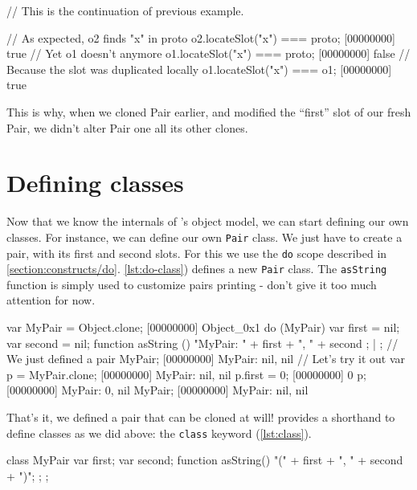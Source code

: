\documentclass[openright,twoside,12pt]{report}
\begin{document}
\begin{urbiscript}[caption=Inspecting copy on write,
  label=lst:check-copy-on-write, name=cow]
// This is the continuation of previous example.

// As expected, o2 finds "x" in proto
o2.locateSlot("x") === proto;
[00000000] true
// Yet o1 doesn't anymore
o1.locateSlot("x") === proto;
[00000000] false
// Because the slot was duplicated locally
o1.locateSlot("x") === o1;
[00000000] true
\end{urbiscript}

This is why, when we cloned Pair earlier, and modified the ``first''
slot of our fresh Pair, we didn't alter Pair one all its other clones.

\section{Defining classes}

Now that we know the internals of \urbi's object model, we can start
defining our own classes. For instance, we can define our own
\texttt{Pair} class. We just have to create a pair, with its first and
second slots. For this we use the \texttt{do} scope described in
\autoref{section:constructs/do}. \autoref{lst:do-class}) defines a new
\texttt{Pair} class. The \texttt{asString} function is simply used to
customize pairs printing - don't give it too much attention for now.

\begin{urbiscript}[caption=Defining our own \texttt{MyPair} class,
  label=lst:do-class]
var MyPair = Object.clone;
[00000000] Object_0x1
do (MyPair)
{
  var first = nil;
  var second = nil;
  function asString ()
  {
    "MyPair: " + first + ", " + second
  };
} | {};
// We just defined a pair
MyPair;
[00000000] MyPair: nil, nil
// Let's try it out
var p = MyPair.clone;
[00000000] MyPair: nil, nil
p.first = 0;
[00000000] 0
p;
[00000000] MyPair: 0, nil
MyPair;
[00000000] MyPair: nil, nil
\end{urbiscript}

That's it, we defined a pair that can be cloned at will! \urbi
provides a shorthand to define classes as we did above: the
\texttt{class} keyword (\autoref{lst:class}).

\begin{urbiscript}[caption=Using the \texttt{class} construct,
  label=lst:class, name=my-pair]
class MyPair
{
  var first;
  var second;
  function asString() { "(" + first + ", " + second + ")"; };
};
\end{urbiscript}
\end{document}
